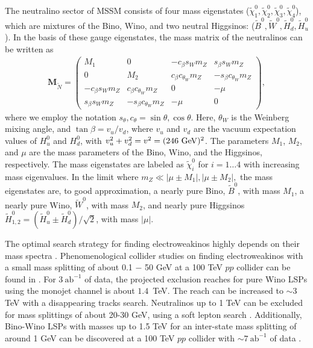 \documentclass[a4paper,11pt]{article}
\renewcommand{\H}{\widetilde{H}^0}
\newcommand{\W}{\widetilde{W}^0}
\newcommand{\B}{\widetilde{B}^0}
\newcommand{\N}{\widetilde{\chi}^0}
\newcommand{\cb}{ c_\beta}
\newcommand{\cw}{ c_{\theta_W}}
\newcommand{\sinb}{ s_\beta}
\newcommand{\sw}{ s_W}
\newcommand{\mz}{ m_Z}
\begin{document}
 
The neutralino sector of MSSM consists of four mass eigenstates
($\N_1,\N_2,\N_3,\N_4$), which are mixtures of the Bino, Wino, and two neutral
Higgsinos: ($\B,\W,\H_d,\H_u$). In the basis of these gauge
eigenstates, the mass matrix of the neutralinos can be written as
\begin{align}
  \mathbf{M}_{\widetilde{N}}=
  \begin{pmatrix}
    M_1         & 0            & -\cb\sw\mz & \sinb\sw\mz \\
    0           & M_2          & \cb\cw\mz  & -\sinb\cw\mz \\
    -\cb\sw\mz  & \cb\cw\mz    & 0          & -\mu \\
    \sinb\sw\mz & -\sinb\cw\mz & -\mu       & 0
  \end{pmatrix},
\end{align} 
where we employ the notation $s_\theta, c_\theta = \sin\theta, \cos\theta$. Here,  $\theta_W$ is the Weinberg mixing angle, 
and $\tan\beta= v_u/v_d$, where $v_u$ and $v_d$ are the vacuum
expectation values of $H_u^0$ and $H_d^0$, with $v_u^2+v_d^2=v^2=(246\ {\rm
GeV})^2$. The parameters $M_1$, $M_2$, and $\mu$ are the mass parameters of
the Bino, Wino, and the Higgsinos, respectively.
The mass eigenstates are labeled as $\N_i$ for $i=1 \ldots 4$ with increasing mass eigenvalues.
In the limit where $\mz \ll |\mu\pm M_1|, |\mu\pm M_2|,$ the mass eigenstates
are, to good approximation, a nearly pure Bino, $\B$, with mass $M_1$,
a nearly pure Wino, $\W$, with mass $M_2$, and nearly pure Higgsinos
$\H_{1,2} = (\H_u \pm \H_d)/\sqrt{2}$, with mass
$|\mu|$. 

The optimal search strategy for finding electroweakinos   highly depends on
their mass spectra \cite{Han:2013kza}.  Phenomenological collider studies on
finding electroweakinos with a small mass splitting of about 0.1 $-$ 50 GeV at a
100 TeV $pp$  collider can be found in \cite{Low:2014cba, Bramante:2014tba,
Berlin:2015aba, Cirelli:2014dsa}.
For $3\ \text{ab}^{-1}$ of data, the projected exclusion reaches for pure Wino
LSPs using the monojet channel is about $1.4$~TeV.  The reach
can be increased to $\sim3$ TeV with a disappearing tracks search.
Neutralinos up to 1 TeV can be excluded for mass splittings of about 20-30 GeV,
using a soft lepton search \cite{Low:2014cba}. Additionally, Bino-Wino LSPs
with masses up to 1.5 TeV for an inter-state mass splitting of around 1 GeV  can be
discovered at a 100 TeV $pp$ collider with $\sim7\ \text{ab}^{-1}$
of data \cite{Bramante:2014tba}.
\end{document}
